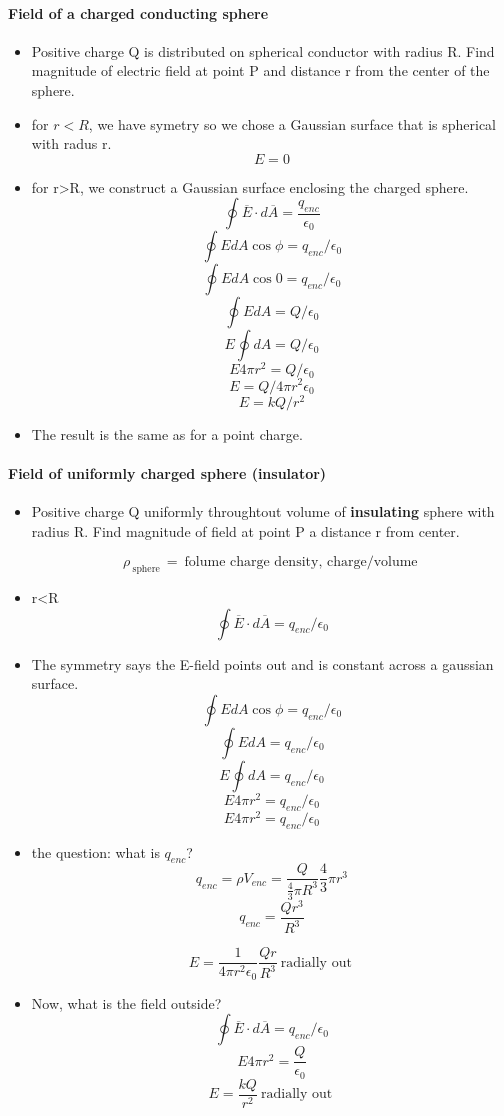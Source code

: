 \paragraph{Field of a charged conducting sphere}
\begin{itemize}
	\item Positive charge Q is distributed on spherical conductor with radius R. Find magnitude of
		electric field at point P and distance r from the center of the sphere.
	\item for $r<R$, we have symetry so we chose a Gaussian surface that is spherical with radus r.
		\[ E = 0\]
	\item for r>R, we construct a Gaussian surface enclosing the charged sphere.
		\[\oint \overline{E} \cdot d\overline{A} = \frac{q_{enc}}{\epsilon_0}\]
		\[\oint E dA \cos \phi = q_{enc}/\epsilon_0\]
		\[\oint E dA \cos 0 = q_{enc}/\epsilon_0\]
		\[\oint E dA  = Q/\epsilon_0\]
		\[E\oint  dA  = Q/\epsilon_0\]
		\[E 4\pi r^2  = Q/\epsilon_0\]
		\[E = Q/4\pi r^2  \epsilon_0\]
		\[E = kQ/ r^2  \]
	\item The result is the same as for a point charge.
\end{itemize}

\paragraph{Field of uniformly charged sphere (insulator)}
\begin{itemize}
	\item Positive charge Q uniformly throughtout volume of \textbf{insulating} sphere with radius R.
		Find magnitude of field at point P a distance r from center.

		\[ \rho_{\:\text{sphere}\:} = \:\text{folume charge density, charge/volume}\:\]
	\item r<R
		\[\oint \overline{E} \cdot d\overline{A} = q_{enc}/\epsilon_0\]
	\item The symmetry says the E-field points out and is constant across a gaussian surface.
		\[\oint E d A \cos \phi = q_{enc}/\epsilon_0\]
		\[\oint E d A = q_{enc}/\epsilon_0\]
		\[E\oint  d A = q_{enc}/\epsilon_0\]
		\[E 4 \pi r^2 = q_{enc}/\epsilon_0\]
		\[E 4 \pi r^2 = q_{enc}/\epsilon_0\]
		\item the question: what is $q_{enc}$?
			\[q_{enc} = \rho V_{enc} = \frac{Q}{\frac{4}{3}\pi R^3}\frac{4}{3}\pi r^3\]
			\[q_{enc} = \frac{Qr^3}{R^3}\]

		\[E = \frac{1}{4 \pi r^2 \epsilon_0 }\frac{Qr}{R^3}\:\text{radially out}\:\]
	\item Now, what is the field outside?
		\[\oint \overline{E} \cdot d \overline{A} = q_{enc}/\epsilon_0 \]
		\[E 4 \pi r^2 = \frac{Q}{\epsilon_0}\]
		\[E = \frac{kQ}{r^2}\:\text{radially out}\:\]
\end{itemize}

